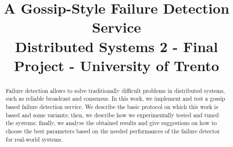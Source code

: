 \documentclass[conference]{IEEEtran}
\begin{document}
\title{
	A Gossip-Style Failure Detection Service \\
    \large Distributed Systems 2 - Final Project - University of Trento
}

\author{
    \and
    \and
}

\maketitle

\begin{abstract}
Failure detection allows to solve traditionally difficult problems in distributed systems,
such as reliable broadcast and consensus.
In this work, we implement and test a gossip based failure detection service.
We describe the basic protocol on which this work is based and some variants;
then, we describe how we experimentally tested and tuned the systems;
finally, we analyse the obtained results and give suggestions on how to choose the best parameters based on the needed performances of the failure detector for real-world systems.
\end{abstract}

\acresetall











\end{document}
